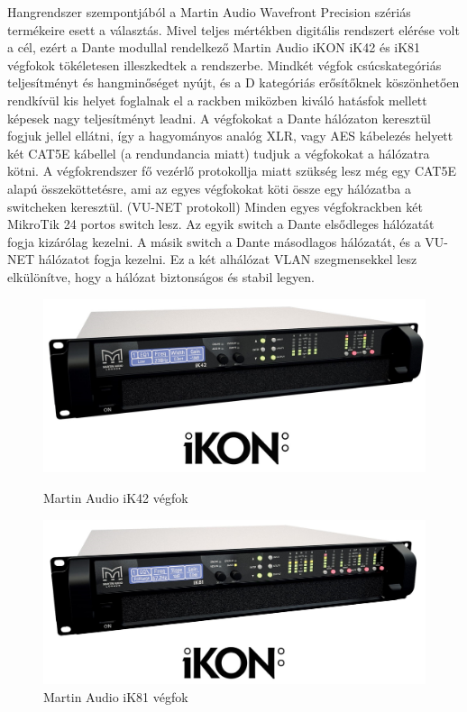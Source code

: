 Hangrendszer szempontjából a Martin Audio Wavefront Precision szériás termékeire esett a választás.
Mivel teljes mértékben digitális rendszert elérése volt a cél, ezért a Dante modullal
rendelkező Martin Audio iKON iK42 és iK81 végfokok tökéletesen illeszkedtek a rendszerbe.
Mindkét végfok csúcskategóriás teljesítményt és hangminőséget nyújt, és a D kategóriás
erősítőknek köszönhetően rendkívül kis helyet foglalnak el a rackben miközben kiváló hatásfok
mellett képesek nagy teljesítményt leadni. A végfokokat a Dante hálózaton keresztül
fogjuk jellel ellátni, így a hagyományos analóg XLR, vagy AES kábelezés helyett két CAT5E kábellel (a rendundancia miatt)
tudjuk a végfokokat a hálózatra kötni. A végfokrendszer fő vezérlő protokollja miatt szükség lesz még egy CAT5E alapú
összeköttetésre, ami az egyes végfokokat köti össze egy hálózatba a switcheken keresztül. (VU-NET protokoll)
Minden egyes végfokrackben két MikroTik 24 portos switch lesz. Az egyik switch a Dante elsődleges hálózatát fogja kizárólag kezelni.
A másik switch a Dante másodlagos hálózatát, és a VU-NET hálózatot fogja kezelni.
Ez a két alhálózat VLAN szegmensekkel lesz elkülönítve, hogy a hálózat biztonságos és stabil legyen.
\begin{figure}[H]
    \centering
    \begin{minipage}{0.45\textwidth}
        \centering
        \includegraphics[width=\linewidth, keepaspectratio]{figures/ikon_ik42.jpg}
        \caption{Martin Audio iK42 végfok}\label{fig:ikon_ik42}
    \end{minipage}\hfill
    \begin{minipage}{0.45\textwidth}
        \centering
        \includegraphics[width=\linewidth, keepaspectratio]{figures/ikon_ik81.jpg}
        \caption{Martin Audio iK81 végfok}\label{fig:ikon_ik81}
    \end{minipage}
\end{figure}

